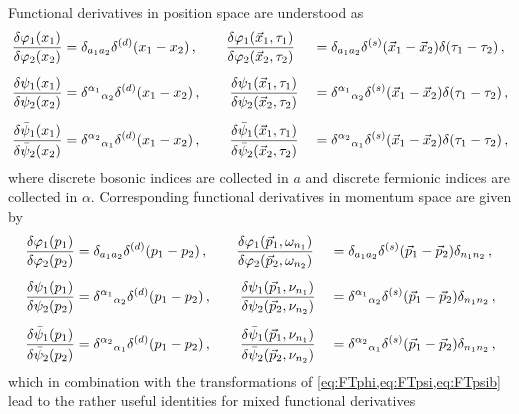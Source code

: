 Functional derivatives in position space are understood as
\begin{alignat}{2}
	\frac{\delta \MFphi_1(x_1)}{\delta \MFphi_2(x_2)} &= \delta_{a_1 a_2}\delta^{(d)}(x_1-x_2) \, ,\qquad%
	\frac{\delta \MFphi_1(\vec{x}_1,\tau_1)}{\delta \MFphi_2(\vec{x}_2,\tau_2)} &&=\delta_{a_1 a_2}\delta^{(s)}(\vec{x}_1-\vec{x}_2) \delta(\tau_1-\tau_2) \, ,\\[.5em]
	\frac{\delta \MFpsi_1(x_1)}{\delta \MFpsi_2(x_2)} &= \delta^{\alpha_1}{}_{\alpha_2} \delta^{(d)}(x_1-x_2) \, ,\qquad%
	\frac{\delta \MFpsi_1(\vec{x}_1,\tau_1)}{\delta \MFpsi_2(\vec{x}_2,\tau_2)} &&= \delta^{\alpha_1}{}_{\alpha_2} \delta^{(s)}(\vec{x}_1-\vec{x}_2) \delta(\tau_1-\tau_2) \, ,\\[.5em]
	\frac{\delta \MFpsib_1(x_1)}{\delta \MFpsib_2(x_2)} &= \delta^{\alpha_2}{}_{\alpha_1} \delta^{(d)}(x_1-x_2) \, ,\qquad%
	\frac{\delta \MFpsib_1(\vec{x}_1,\tau_1)}{\delta \MFpsib_2(\vec{x}_2,\tau_2)} &&= \delta^{\alpha_2}{}_{\alpha_1} \delta^{(s)}(\vec{x}_1-\vec{x}_2) \delta(\tau_1-\tau_2) \, ,
\end{alignat}
where discrete bosonic indices are collected in $a$ and discrete fermionic indices are collected in $\alpha$.
Corresponding functional derivatives in momentum space are given by
\begin{alignat}{2}
	\frac{\delta \MFphi_1(p_1)}{\delta \MFphi_2(p_2)} &= \delta_{a_1 a_2}\delta^{(d)}(p_1-p_2) \, ,\qquad%
		\frac{\delta \MFphi_1(\vec{p}_1,\omega_{n_1})}{\delta \MFphi_2(\vec{p}_2,\omega_{n_2})} &&= \delta_{a_1 a_2}\delta^{(s)}(\vec{p}_1-\vec{p}_2) \delta_{n_1 n_2} \, ,\\[.5em]
	\frac{\delta \MFpsi_1(p_1)}{\delta \MFpsi_2(p_2)} &= \delta^{\alpha_1}{}_{\alpha_2} \delta^{(d)}(p_1-p_2) \, ,\qquad%
		\frac{\delta \MFpsi_1(\vec{p}_1,\nu_{n_1})}{\delta \MFpsi_2(\vec{p}_2,\nu_{n_2})} &&= \delta^{\alpha_1}{}_{\alpha_2} \delta^{(s)}(\vec{p}_1-\vec{p}_2) \delta_{n_1 n_2} \, ,\\[.5em]
	\frac{\delta \MFpsib_1(p_1)}{\delta \MFpsib_2(p_2)} &= \delta^{\alpha_2}{}_{\alpha_1} \delta^{(d)}(p_1-p_2) \, ,\qquad%
		\frac{\delta \MFpsib_1(\vec{p}_1,\nu_{n_1})}{\delta \MFpsib_2(\vec{p}_2,\nu_{n_2})} &&= \delta^{\alpha_2}{}_{\alpha_1} \delta^{(s)}(\vec{p}_1-\vec{p}_2) \delta_{n_1 n_2} \, ,
\end{alignat}
which in combination with the transformations of \cref{eq:FTphi,eq:FTpsi,eq:FTpsib} lead to the rather useful identities for mixed functional derivatives
